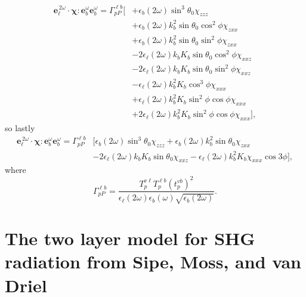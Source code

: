 \begin{equation*}
\begin{split}
\mathbf{e}^{\,2\omega}_{\ell}\cdot
\boldsymbol{\chi}:\mathbf{e}^{\omega}_{b}\mathbf{e}^{\omega}_{b} = 
\Gamma^{\ell b}_{pP}
\bigg[
&+ \epsilon_{b}(2\omega)\sin^{3}\theta_{0}\chi_{zzz}\\
&+ \epsilon_{b}(2\omega)k^{2}_{b}\sin\theta_{0}\cos^{2}\phi\chi_{zxx}\\
&+ \epsilon_{b}(2\omega)k^{2}_{b}\sin\theta_{0}\sin^{2}\phi\chi_{zxx}\\
&- 2\epsilon_{\ell}(2\omega)k_{b}K_{b}\sin\theta_{0}\cos^{2}\phi\chi_{xxz}\\
&- 2\epsilon_{\ell}(2\omega)k_{b}K_{b}\sin\theta_{0}\sin^{2}\phi\chi_{xxz}\\
&- \epsilon_{\ell}(2\omega)k^{2}_{b}K_{b}\cos^{3}\phi\chi_{xxx}\\
&+ \epsilon_{\ell}(2\omega)k^{2}_{b}K_{b}\sin^{2}\phi\cos\phi\chi_{xxx}\\
&+ 2\epsilon_{\ell}(2\omega)k^{2}_{b}K_{b}\sin^{2}\phi\cos\phi\chi_{xxx}
\bigg],
\end{split}
\end{equation*}
so lastly
\begin{equation*}
\begin{split}
\mathbf{e}^{\,2\omega}_{\ell}\cdot
\boldsymbol{\chi}:\mathbf{e}^{\omega}_{b}\mathbf{e}^{\omega}_{b} = 
\Gamma^{\ell b}_{pP}&
\bigg[
  \epsilon_{b}(2\omega)\sin^{3}\theta_{0}\chi_{zzz}
+ \epsilon_{b}(2\omega)k^{2}_{b}\sin\theta_{0}\chi_{zxx}\\
&- 2\epsilon_{\ell}(2\omega)k_{b}K_{b}\sin\theta_{0}\chi_{xxz}
- \epsilon_{\ell}(2\omega)k^{2}_{b}K_{b}\chi_{xxx}\cos3\phi
\bigg],
\end{split}
\end{equation*}
where
\begin{equation*}
\Gamma^{\ell b}_{pP}=
\frac{T^{v\ell}_{p}T^{\ell b}_{p}\left(t^{vb}_{p}\right)^{2}}
  {\epsilon_{\ell}({2\omega})\epsilon_{b}(\omega)\sqrt{\epsilon_{b}(2\omega)}}.
\end{equation*}


\section{The two layer model for SHG radiation from Sipe, Moss, and van Driel}
\label{app:sipe_moss_vandriel}

